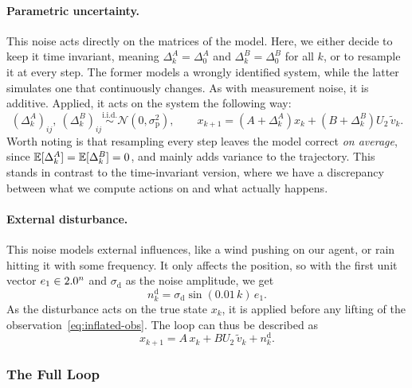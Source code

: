 \paragraph{Parametric uncertainty.}
This noise acts directly on the matrices of the model. Here, we either decide to keep
it time invariant, meaning $\Delta^{A}_k = \Delta^{A}_0$ and $\Delta^{B}_k = \Delta^{B}_0$ for all $k$, or to resample it
at every step. The former models a wrongly identified system, while the latter
simulates one that continuously changes. As with measurement noise, it is additive.
Applied, it acts on the system the
following way:
\begin{equation}
    \label{eq:parametric-noise}
    \left( \Delta_k^{A} \right)_{ij},\ \left( \Delta_k^{B} \right)_{ij}
    \overset{\text{i.i.d.}}{\sim} \mathcal{N}\!\left(0, \sigma_{\mathrm{p}}^{2}\right),
    \qquad
    x_{k+1} = \left( A + \Delta_k^{A} \right) x_k + \left( B + \Delta_k^{B} \right) U_2\, \tilde{v}_k .
\end{equation}
Worth noting is that resampling every
step leaves the model correct \emph{on average}, since
$\mathbb{E}[\Delta^{A}_k] = \mathbb{E}[\Delta^{B}_k] = 0$, and mainly adds variance to the trajectory. This stands
in contrast to the time-invariant version, where we have a discrepancy between
what we compute actions on and what actually happens.

\paragraph{External disturbance.}
This noise models external influences, like a wind pushing on our
agent, or rain
hitting it with some frequency. It only affects the position, so with the first unit
vector $e_1 \in 2.0^{n}$ and $\sigma_{\mathrm{d}}$ as the noise amplitude, we get
\begin{equation}
    \label{eq:dist-sin}
    n^{\mathrm{d}}_k = \sigma_{\mathrm{d}} \sin(0.01\,k)\, e_1 .
\end{equation}
As the disturbance acts on the true state $x_k$, it is applied before any
lifting of the observation~\eqref{eq:inflated-obs}. The loop can thus
be described as
\begin{equation}
    \label{eq:disturbance-step}
    x_{k+1} = A\, x_k + B U_2\, \tilde{v}_k + n^{\mathrm{d}}_k .
\end{equation}

\subsubsection{The Full Loop}
\label{subsubsec:full-noise}

